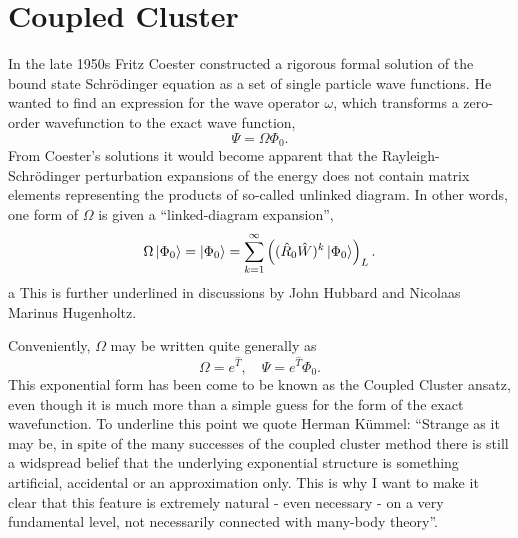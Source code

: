 \chapter{Coupled Cluster}
\label{ch:coupled_cluster_theory}

In the late 1950s Fritz Coester constructed a rigorous formal solution of the bound
state Schrödinger equation as a set of single particle wave
functions\cite{coester1958bound}. He wanted to find an expression for the wave operator 
$\omega$, which transforms a zero-order wavefunction to the exact wave function,
\begin{equation}
    \Psi = \Omega \Phi_0.
\end{equation}
From Coester's solutions it would become apparent that the Rayleigh-Schrödinger 
perturbation expansions of the energy does not contain matrix elements representing 
the products of so-called unlinked diagram. In other words, one form of $\Omega$ is 
given a ``linked-diagram expansion'',
\begin{equation}
    \Omega\ket{\Phi_0} = \ket{\Phi_0} 
    = \sum_{k=1}^\infty\left((\hat{R}_0\hat{W})^k \ket{{\Phi_0}} \right)_L.
\end{equation}a
This is further underlined in discussions by John Hubbard\cite{hubbard1957description}
and Nicolaas Marinus Hugenholtz\cite{hugenholtz1957perturbation}.

Conveniently, $\Omega$ may be written quite generally as
\begin{equation}
    \Omega = e^{\hat{T}}, \quad \Psi = e^{\hat{T}}\Phi_0.
\end{equation}
This exponential form has been come to be known as the Coupled Cluster ansatz, even 
though it is much more than a simple guess for the form of the exact wavefunction.
To underline this point we quote Herman Kümmel: ``Strange as it may be, in spite of
the many successes of the coupled cluster method there is still a widspread belief
that the underlying exponential structure is something artificial, accidental or 
an approximation only. This is why I want to make it clear that this feature is 
extremely natural - even necessary - on a very fundamental level, not necessarily
connected with many-body theory''\cite{kummel1991origins}. 

